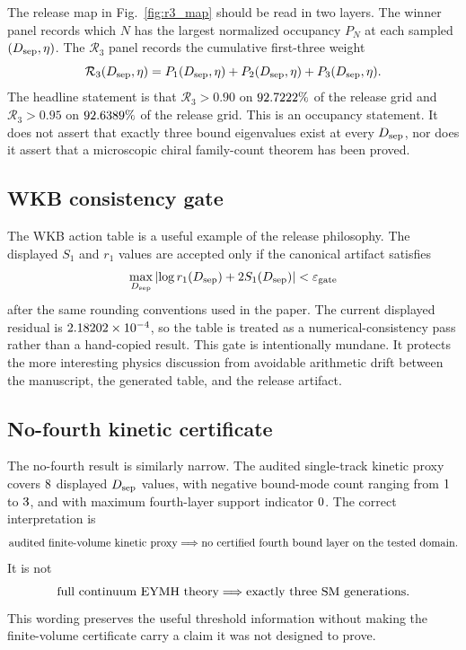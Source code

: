 \documentclass[aps,prd,onecolumn,notitlepage,nofootinbib,superscriptaddress,11pt,floatfix]{revtex4-2}
\newcommand{\Rthree}{\mathcal{R}_3}
\newcommand{\Dsep}{D_{\rm sep}}
\begin{document}
The release map in Fig.~\ref{fig:r3_map} should be read in two layers.
The winner panel records which \(N\) has the largest normalized occupancy \(P_N\) at each sampled \((\Dsep,\eta)\).
The \(\Rthree\) panel records the cumulative first-three weight
\begin{equation}
    \Rthree(\Dsep,\eta)=P_1(\Dsep,\eta)+P_2(\Dsep,\eta)+P_3(\Dsep,\eta).
\end{equation}
The headline statement is that \(\Rthree>0.90\) on \(92.7222\%\) of the release grid and \(\Rthree>0.95\) on \(92.6389\%\) of the release grid.
This is an occupancy statement.
It does not assert that exactly three bound eigenvalues exist at every \(\Dsep\), nor does it assert that a microscopic chiral family-count theorem has been proved.

\subsection{WKB consistency gate}

The WKB action table is a useful example of the release philosophy.
The displayed \(S_1\) and \(r_1\) values are accepted only if the canonical artifact satisfies
\begin{equation}
    \max_{\Dsep}\left|\log r_1(\Dsep)+2S_1(\Dsep)\right|
    <\varepsilon_{\rm gate}
    \label{eq:wkb_gate}
\end{equation}
after the same rounding conventions used in the paper.
The current displayed residual is \(2.18202\times 10^{-4}\), so the table is treated as a numerical-consistency pass rather than a hand-copied result.
This gate is intentionally mundane.
It protects the more interesting physics discussion from avoidable arithmetic drift between the manuscript, the generated table, and the release artifact.

\subsection{No-fourth kinetic certificate}

The no-fourth result is similarly narrow.
The audited single-track kinetic proxy covers \(8\) displayed \(\Dsep\) values, with negative bound-mode count ranging from \(1\) to \(3\), and with maximum fourth-layer support indicator \(0\).
The correct interpretation is
\begin{equation}
    \hbox{audited finite-volume kinetic proxy}
    \Longrightarrow
    \hbox{no certified fourth bound layer on the tested domain}.
\end{equation}
It is not
\begin{equation}
    \hbox{full continuum EYMH theory}
    \Longrightarrow
    \hbox{exactly three SM generations}.
\end{equation}
This wording preserves the useful threshold information without making the finite-volume certificate carry a claim it was not designed to prove.
\end{document}
